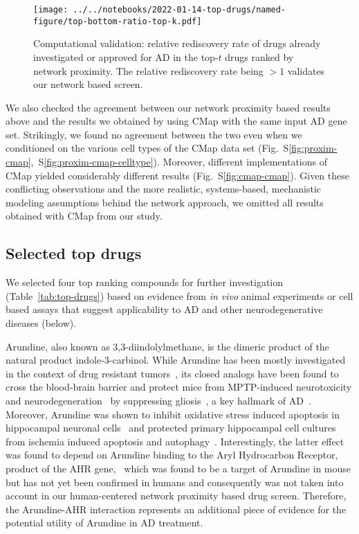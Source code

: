 \documentclass[letterpaper]{article}
\begin{document}
\begin{figure}
\texttt{[image: ../../notebooks/2022-01-14-top-drugs/named-figure/top-bottom-ratio-top-k.pdf]}
\caption{
Computational validation: relative rediscovery rate of drugs already investigated or
approved for AD in the top-$t$ drugs ranked by network proximity.  The relative
rediscovery rate being $>1$ validates our network based screen.
}
\label{fig:ad-drug-rediscovery}
\end{figure}

We also checked the agreement between our network proximity based results
above and the results we obtained by using CMap with the same input AD gene
set.  Strikingly, we found no agreement between the two even when we
conditioned on the various cell types of the CMap data set
(Fig.~S\ref{fig:proxim-cmap},~S\ref{fig:proxim-cmap-celltype}).  Moreover,
different implementations of CMap yielded considerably different results
(Fig.~S\ref{fig:cmap-cmap}).  Given these conflicting observations and the
more realistic, systems-based, mechanistic modeling assumptions behind the
network approach, we omitted all results obtained with CMap from our study.

\subsection{Selected top drugs}

We selected four top ranking compounds for further investigation
(Table~\ref{tab:top-drugs}) based on evidence from \emph{in vivo} animal
experiments or cell based assays that suggest applicability to AD and other
neurodegenerative diseases (below).

Arundine, also known as 3,3-diindolylmethane, is the dimeric product of the
natural product indole-3-carbinol.  While Arundine has been mostly
investigated in the context of drug resistant tumors~\citep{Biersack2020}, its
closed analogs have been found to cross the blood-brain barrier and protect
mice from MPTP-induced neurotoxicity and
neurodegeneration~\citep{DeMiranda2013} by suppressing
gliosis~\citep{DeMiranda2014}, a key hallmark of AD~\citep{DeStrooper2016}.
Moreover, Arundine was shown to inhibit oxidative stress induced apoptosis in
hippocampal neuronal cells~\citep{Lee2019} and protected primary hippocampal
cell cultures from ischemia induced apoptosis and
autophagy~\citep{Rzemieniec2019}.  Interestingly, the latter effect was found
to depend on Arundine binding to the Aryl Hydrocarbon Receptor, product of the
AHR gene,~\citep{Rzemieniec2019} which was found to be a target of Arundine in
mouse but has not yet been confirmed in humans and consequently was not taken
into account in our human-centered network proximity based drug screen.
Therefore, the Arundine-AHR interaction represents an additional piece of
evidence for the potential utility of Arundine in AD treatment.
\end{document}
